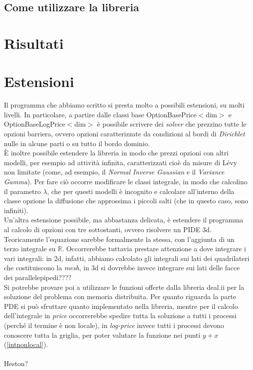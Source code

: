 \documentclass[a4paper,10pt]{report}
\theoremstyle{plain}
\theoremstyle{definition}
\theoremstyle{remark}
\begin{document}
\section{Come utilizzare la libreria}

\chapter{Risultati}
\chapter{Estensioni}
Il programma che abbiamo scritto si presta molto a possibili estensioni, su molti livelli. In particolare, a partire dalle classi base \textsf{OptionBasePrice$<$dim$>$} e \textsf{OptionBaseLogPrice$<$dim$>$} \`e possibile scrivere dei \emph{solver} che prezzino tutte le opzioni barriera, ovvero opzioni caratterizzate da condizioni al bordi di \emph{Dirichlet} nulle in alcune parti o su tutto il bordo dominio.\\\`E inoltre possibile estendere la libreria in modo che prezzi opzioni con altri modelli, per esempio ad attivit\`a infinita, caratterizzati cio\`e da misure di L\'evy non limitate (come, ad esempio, il \emph{Normal Inverse Gaussian} e il \emph{Variance Gamma}). Per fare ci\`o occorre modificare le classi integrale, in modo che calcolino il parametro $\lambda$, che per questi modelli \`e incognito e calcolare all'interno della classe opzione la diffusione che approssima i piccoli salti (che in questo caso, sono infiniti).\\Un'altra estensione possibile, ma abbastanza delicata, \`e estendere il programma al calcolo di opzioni con tre sottostanti, ovvero risolvere un PIDE 3d. Teoricamente l'equazione sarebbe formalmente la stessa, con l'aggiunta di un terzo integrale su $\mathbb{R}$. Occorrerebbe tuttavia prestare attenzione a dove integrare i vari integrali: in 2d, infatti, abbiamo calcolato gli integrali sui lati dei quadrilateri che costituiscono la \emph{mesh}, in 3d si dovrebbe invece integrare sui lati delle facce dei parallelepipedi????\\Si potrebbe provare poi a utilizzare le funzioni offerte dalla libreria \textsf{deal.ii} per la soluzione del problema con memoria distribuita. Per quanto riguarda la parte PDE si pu\`o sfruttare quanto implementato nella libreria, mentre per il calcolo dell'integrale in \emph{price} occorrerebbe spedire tutta la soluzione a tutti i processi (perch\'e il termine \`e non locale), in \emph{log-price} invece tutti i processi devono conoscere tutta la griglia, per poter valutare la funzione nei punti $y+x$ (\ref{intnonlocal}).\\\\
Heston?
\clearpage
{}


\end{document}

